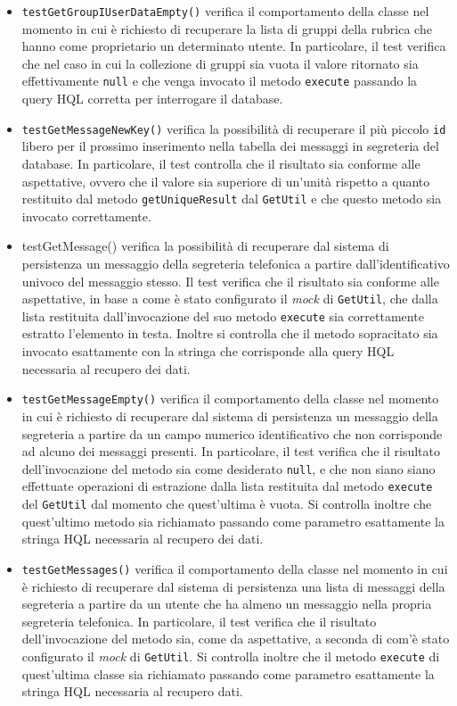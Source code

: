 \begin{itemize}
\begin{itemize}
\item \texttt{testGetGroupIUserDataEmpty()} verifica il comportamento della classe nel momento in cui è richiesto di recuperare la lista di gruppi della rubrica che hanno come proprietario un determinato utente. In particolare, il test verifica che nel caso in cui la collezione di gruppi sia vuota il valore ritornato sia effettivamente \texttt{null} e che venga invocato il metodo \texttt{execute} passando la query HQL corretta per interrogare il database.

\item \texttt{testGetMessageNewKey()} verifica la possibilità di recuperare il più piccolo \texttt{id} libero per il prossimo inserimento nella tabella dei messaggi in segreteria del database. In particolare, il test controlla che il risultato sia conforme alle aspettative, ovvero che il valore sia superiore di un'unità rispetto a quanto restituito dal metodo \texttt{getUniqueResult} dal \texttt{GetUtil} e che questo metodo sia invocato correttamente.

\item \texttt{}testGetMessage() verifica la possibilità di recuperare dal sistema di persistenza un messaggio della segreteria telefonica a partire dall'identificativo univoco del messaggio stesso. Il test verifica che il risultato sia conforme alle aspettative, in base a come è stato configurato il \textit{mock} di \texttt{GetUtil}, che dalla lista restituita dall'invocazione del suo metodo \texttt{execute} sia correttamente estratto l'elemento in testa. Inoltre si controlla che il metodo sopracitato sia invocato esattamente con la stringa che corrisponde alla query HQL necessaria al recupero dei dati.

\item \texttt{testGetMessageEmpty()} verifica il comportamento della classe nel momento in cui è richiesto di recuperare dal sistema di persistenza un messaggio della segreteria a partire da un campo numerico identificativo che non corrisponde ad alcuno dei messaggi presenti. In particolare, il test verifica che il risultato dell'invocazione del metodo sia come desiderato \texttt{null}, e che non siano siano effettuate operazioni di estrazione dalla lista restituita dal metodo \texttt{execute} del \texttt{GetUtil} dal momento che quest'ultima è vuota.
Si controlla inoltre che quest'ultimo metodo sia richiamato passando come parametro esattamente la stringa HQL necessaria al recupero dei dati.

\item \texttt{testGetMessages()} verifica il comportamento della classe nel momento in cui è richiesto di recuperare dal sistema di persistenza una lista di messaggi della segreteria a partire da un utente che ha almeno un messaggio nella propria segreteria telefonica. In particolare, il test verifica che il risultato dell'invocazione del metodo sia, come da aspettative, a seconda di com'è stato configurato il \textit{mock} di \texttt{GetUtil}. Si controlla inoltre che il metodo \texttt{execute} di quest'ultima classe sia richiamato passando come parametro esattamente la stringa HQL necessaria al recupero dati.


\end{itemize}
\end{itemize}
